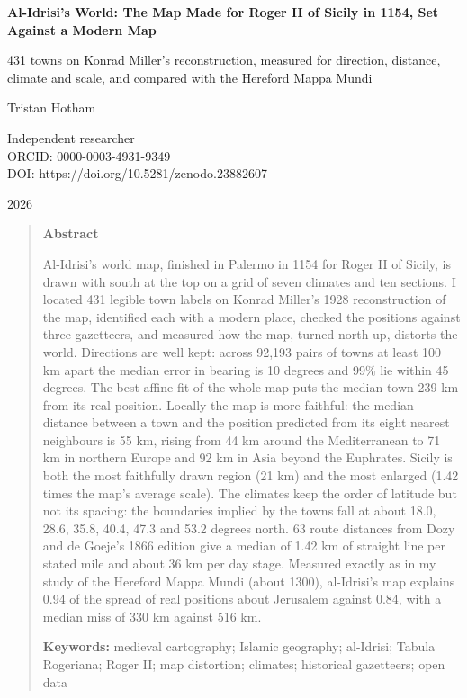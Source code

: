 \documentclass[11pt,a4paper]{article}
\begin{document}
\begin{center}
{\Large\bfseries Al-Idrisi's World: The Map Made for Roger II of Sicily in 1154, Set Against a Modern Map\par}
\vspace{0.4em}
{\large 431 towns on Konrad Miller's reconstruction, measured for direction, distance, climate and scale, and compared with the Hereford Mappa Mundi\par}
\vspace{1.2em}
{\large Tristan Hotham\par}
\vspace{0.3em}
{\small Independent researcher\\
ORCID: 0000-0003-4931-9349\\
DOI: https://doi.org/10.5281/zenodo.23882607\par}
\vspace{0.8em}
2026
\end{center}

\begin{quote}
\small
\begin{center}\textbf{Abstract}\end{center}
Al-Idrisi's world map, finished in Palermo in 1154 for Roger II of Sicily, is drawn with south at the top on a grid of seven climates and ten sections. I located 431 legible town labels on Konrad Miller's 1928 reconstruction of the map, identified each with a modern place, checked the positions against three gazetteers, and measured how the map, turned north up, distorts the world. Directions are well kept: across 92,193 pairs of towns at least 100 km apart the median error in bearing is 10 degrees and 99\% lie within 45 degrees. The best affine fit of the whole map puts the median town 239 km from its real position. Locally the map is more faithful: the median distance between a town and the position predicted from its eight nearest neighbours is 55 km, rising from 44 km around the Mediterranean to 71 km in northern Europe and 92 km in Asia beyond the Euphrates. Sicily is both the most faithfully drawn region (21 km) and the most enlarged (1.42 times the map's average scale). The climates keep the order of latitude but not its spacing: the boundaries implied by the towns fall at about 18.0, 28.6, 35.8, 40.4, 47.3 and 53.2 degrees north. 63 route distances from Dozy and de Goeje's 1866 edition give a median of 1.42 km of straight line per stated mile and about 36 km per day stage. Measured exactly as in my study of the Hereford Mappa Mundi (about 1300), al-Idrisi's map explains 0.94 of the spread of real positions about Jerusalem against 0.84, with a median miss of 330 km against 516 km.

\textbf{Keywords:} medieval cartography; Islamic geography; al-Idrisi; Tabula Rogeriana; Roger II; map distortion; climates; historical gazetteers; open data
\end{quote}
\end{document}
